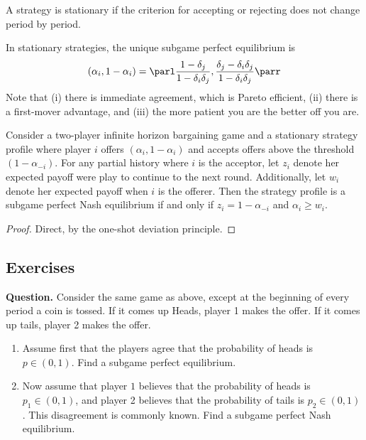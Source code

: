 \documentclass[10pt]{article}
\begin{document}
\begin{definition}
	A strategy is stationary if the criterion for accepting or rejecting does not change period by period.
\end{definition}

\begin{remark}
	In stationary strategies, the unique subgame perfect equilibrium is \[(\alpha_i,1-\alpha_i) = \parl \frac{1-\delta_j}{1-\delta_i\delta_j}, \frac{\delta_j - \delta_i\delta_j}{1-\delta_i\delta_j}\parr\]Note that (i) there is immediate agreement, which is Pareto efficient, (ii) there is a first-mover advantage, and (iii) the more patient you are the better off you are.
\end{remark}

\begin{proposition}
	Consider a two-player infinite horizon bargaining game and a stationary strategy profile where player $i$ offers $(\alpha_i,1-\alpha_i)$ and accepts offers above the threshold $(1-\alpha_{-i})$. For any partial history where $i$ is the acceptor, let $z_i$ denote her expected payoff were play to continue to the next round. Additionally, let $w_i$ denote her expected payoff when $i$ is the offerer. Then the strategy profile is a subgame perfect Nash equilibrium if and only if $z_i = 1-\alpha_{-i}$ and $\alpha_i \ge w_i$.
\end{proposition}
\begin{proof}
	Direct, by the one-shot deviation principle.
\end{proof}

\subsection{Exercises}

\textbf{Question.}
Consider the same game as above, except at the beginning of every period a coin is tossed. If it comes up Heads, player 1 makes the offer. If it comes up tails, player 2 makes the offer.

\begin{enumerate}
	\item Assume first that the players agree that the probability of heads is $p\in (0,1)$. Find a subgame perfect equilibrium.
	\item Now assume that player $1$ believes that the probability of heads is $p_1 \in (0,1)$, and player 2 believes that the probability of tails is $p_2 \in (0,1)$. This disagreement is commonly known. Find a subgame perfect Nash equilibrium.
\end{enumerate}
\end{document}
